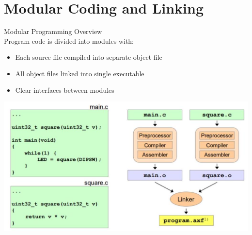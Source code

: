 \section{Modular Coding and Linking}

\begin{concept}{Modular Programming Overview}\\
Program code is divided into modules with:
\begin{itemize}
  \item Each source file compiled into separate object file
  \item All object files linked into single executable
  \item Clear interfaces between modules
\end{itemize}

\includegraphics[width=\linewidth]{images/2024_12_29_79e6b22f503fb7b4f718g-10(2)}
\end{concept}


